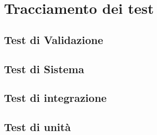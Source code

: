 \documentclass[PianoDiProgetto.tex]{subfiles}
\begin{document}
\chapter{Tracciamento dei test}

\section{Test di Validazione}

\section{Test di Sistema}

\section{Test di integrazione}

\section{Test di unità}	
\end{document}

